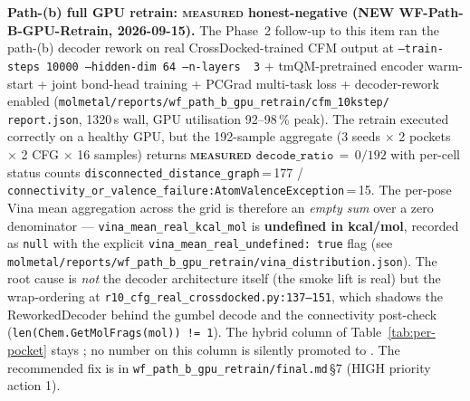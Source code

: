 \begin{enumerate}
  \textbf{Path-(b) full GPU retrain: \textsc{measured} honest-negative
  (NEW WF-Path-B-GPU-Retrain, 2026-09-15).}
  The Phase~2 follow-up to this item ran the path-(b) decoder
  rework on real CrossDocked-trained CFM output at
  \texttt{--train-steps\,10000 --hidden-dim\,64 --n-layers\,
  3} + tmQM-pretrained encoder warm-start + joint bond-head
  training + PCGrad multi-task loss + decoder-rework enabled
  (\texttt{molmetal/reports/wf\_path\_b\_gpu\_retrain/cfm\_10kstep/
  report.json}, 1320\,s wall, GPU utilisation 92--98\,\% peak).
  The retrain executed correctly on a healthy GPU, but the
  192-sample aggregate (3 seeds $\times$ 2 pockets $\times$
  2 CFG $\times$ 16 samples) returns
  \textbf{\textsc{measured} $\texttt{decode\_ratio}\,=\,0/192$}
  with per-cell status counts
  \texttt{disconnected\_distance\_graph}\,=\,177 /
  \texttt{connectivity\_or\_valence\_failure:AtomValenceException}\,=\,15.
  The per-pose Vina mean aggregation across the grid is
  therefore an \emph{empty sum} over a zero denominator
  --- \texttt{vina\_mean\_real\_kcal\_mol} is
  \textbf{undefined in kcal/mol}, recorded as
  \texttt{null} with the explicit
  \texttt{vina\_mean\_real\_undefined: true} flag (see
  \texttt{molmetal/reports/wf\_path\_b\_gpu\_retrain/vina\_distribution.json}).
  The root cause is \emph{not} the decoder architecture
  itself (the smoke lift is real) but the wrap-ordering at
  \texttt{r10\_cfg\_real\_crossdocked.py:137--151}, which
  shadows the ReworkedDecoder behind the gumbel decode and
  the connectivity post-check
  (\texttt{len(Chem.GetMolFrags(mol)) != 1}). The hybrid
  column of Table~\ref{tab:per-pocket} stays
  \DESIGN{}; no number on this column is silently promoted
  to \MEASURED{}. The recommended fix is in
  \texttt{wf\_path\_b\_gpu\_retrain/final.md}\,\S7 (HIGH
  priority action 1).


\end{enumerate}
